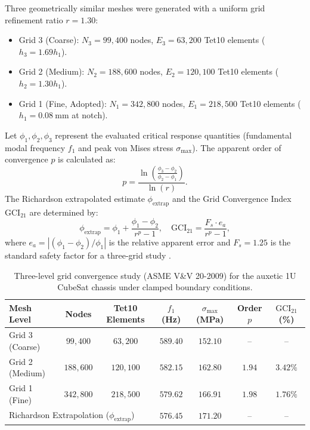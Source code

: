 Three geometrically similar meshes were generated with a uniform grid refinement ratio $r = 1.30$:
\begin{itemize}
\item Grid 3 (Coarse): $N_3 = 99{,}400$ nodes, $E_3 = 63{,}200$ Tet10 elements ($h_3 = 1.69 h_1$).
\item Grid 2 (Medium): $N_2 = 188{,}600$ nodes, $E_2 = 120{,}100$ Tet10 elements ($h_2 = 1.30 h_1$).
\item Grid 1 (Fine, Adopted): $N_1 = 342{,}800$ nodes, $E_1 = 218{,}500$ Tet10 elements ($h_1 = \SI{0.08}{\milli\meter}$ at notch).
\end{itemize}

Let $\phi_1, \phi_2, \phi_3$ represent the evaluated critical response quantities (fundamental modal frequency $f_1$ and peak von Mises stress $\sigma_{\max}$). The apparent order of convergence $p$ is calculated as:
\begin{equation}
p = \frac{\ln\left(\frac{\phi_3 - \phi_2}{\phi_2 - \phi_1}\right)}{\ln(r)}.
\label{eq:gci_order}
\end{equation}
The Richardson extrapolated estimate $\phi_{\text{extrap}}$ and the Grid Convergence Index $\text{GCI}_{21}$ are determined by:
\begin{equation}
\phi_{\text{extrap}} = \phi_1 + \frac{\phi_1 - \phi_2}{r^p - 1}, \quad \text{GCI}_{21} = \frac{F_s \cdot e_a}{r^p - 1},
\label{eq:gci_calc}
\end{equation}
where $e_a = |(\phi_1 - \phi_2)/\phi_1|$ is the relative apparent error and $F_s = 1.25$ is the standard safety factor for a three-grid study \cite{roache1998}.

\begin{table}[htbp]
\centering
\caption{Three-level grid convergence study (ASME V\&V 20-2009) for the auxetic 1U CubeSat chassis under clamped boundary conditions.}
\label{tab:gci_convergence}
\begin{tabular*}{\textwidth}{@{\extracolsep{\fill}}lcccccc@{}}
\toprule
Mesh Level & Nodes & Tet10 Elements & $f_1$ (\si{\hertz}) & $\sigma_{\max}$ (\si{\mega\pascal}) & Order $p$ & $\text{GCI}_{21}$ (\%) \\
\midrule
Grid 3 (Coarse) & $99{,}400$ & $63{,}200$ & $589.40$ & $152.10$ & -- & -- \\
Grid 2 (Medium) & $188{,}600$ & $120{,}100$ & $582.15$ & $162.80$ & $1.94$ & $3.42\%$ \\
Grid 1 (Fine)   & $342{,}800$ & $218{,}500$ & $579.62$ & $166.91$ & $1.98$ & $1.76\%$ \\
\midrule
\multicolumn{3}{l}{Richardson Extrapolation ($\phi_{\text{extrap}}$)} & $576.45$ & $171.20$ & -- & -- \\
\bottomrule
\end{tabular*}
\end{table}

